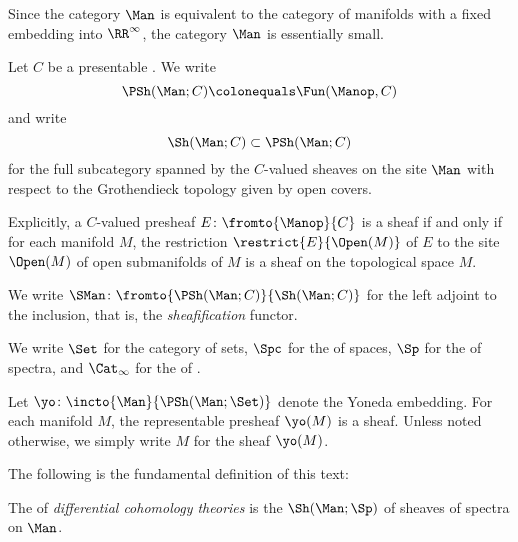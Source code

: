 \begin{remark}
	Since the category $ \Man $ is equivalent to the category of manifolds with a fixed embedding into $ \RR^\infty $, the category $ \Man $ is essentially small.
\end{remark}

\begin{definition}\label{def:sheafonMan}
	Let $ C $ be a presentable \category.
	We write 
	\begin{equation*}
		\PSh(\Man;C) \colonequals \Fun(\Manop,C)
	\end{equation*}
	and write
	\begin{equation*}
		\Sh(\Man;C) \subset \PSh(\Man;C)
	\end{equation*}
	for the full subcategory spanned by the $ C $-valued sheaves on the site $ \Man $ with respect to the Grothendieck topology given by open covers.

	Explicitly, a $ C $-valued presheaf $ E \colon \fromto{\Manop}{C} $ is a sheaf if and only if for each manifold $ M $, the restriction $ \restrict{E}{\Open(M)} $ of $ E $ to the site $ \Open(M) $ of open submanifolds of $ M $ is a sheaf on the topological space $ M $.
\end{definition}

\begin{notation}
	We write $ \SMan \colon \fromto{\PSh(\Man;C)}{\Sh(\Man;C)} $ for the left adjoint to the inclusion, that is, the \textit{sheafification} functor.
\end{notation}

\begin{notation}
	We write $ \Set $ for the category of sets, $ \Spc $ for the \category of spaces, $ \Sp $ for the \category of spectra, and $ \Cat_{\infty} $ for the \category of \categories.
\end{notation}

\begin{example}
	Let $ \yo \colon \incto{\Man}{\PSh(\Man;\Set)} $ denote the Yoneda embedding.
	For each manifold $ M $, the representable presheaf $ \yo(M) $ is a sheaf.
	Unless noted otherwise, we simply write $ M $ for the sheaf $ \yo(M) $.
\end{example}

The following is the fundamental definition of this text:

\begin{definition}\label{def:diffcoh}
	The \category of \textit{differential cohomology theories} is the \category \goodbreak $ \Sh(\Man;\Sp) $ of sheaves of spectra on $ \Man $. 
\end{definition}

